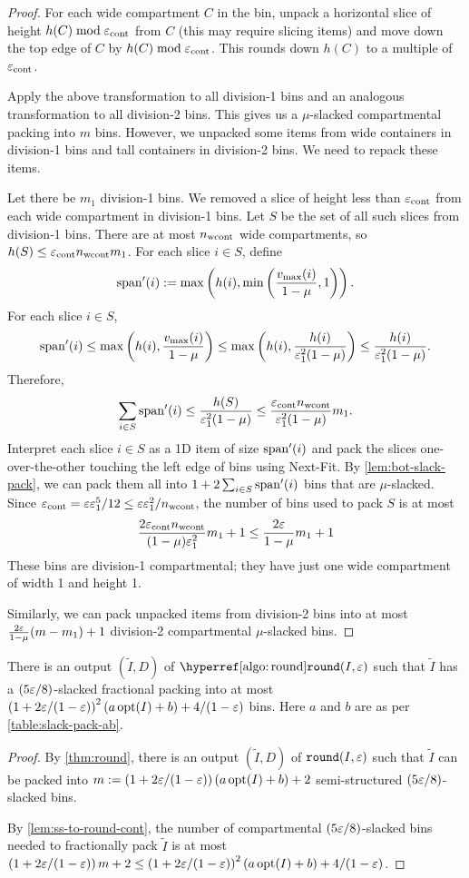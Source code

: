 \begin{proof}
For each wide compartment $C$ in the bin, unpack a horizontal slice of height
$h(C) \bmod \varepsilon_{\mathrm{cont}}$ from $C$ (this may require slicing items)
and move down the top edge of $C$ by $h(C) \bmod \varepsilon_{\mathrm{cont}}$.
This rounds down $h(C)$ to a multiple of $\varepsilon_{\mathrm{cont}}$.

Apply the above transformation to all division-1 bins
and an analogous transformation to all division-2 bins.
This gives us a $\mu$-slacked compartmental packing into $m$ bins.
However, we unpacked some items from wide containers in division-1 bins
and tall containers in division-2 bins. We need to repack these items.

Let there be $m_1$ division-1 bins. We removed a slice of height less than $\varepsilon_{\mathrm{cont}}$
from each wide compartment in division-1 bins.
Let $S$ be the set of all such slices from division-1 bins.
There are at most $n_{\mathrm{wcont}}$ wide compartments, so $h(S) \le \varepsilon_{\mathrm{cont}}n_{\mathrm{wcont}} m_1$.
For each slice $i \in S$, define
\[ \operatorname{span}'(i) := \max\left(h(i), \min\left(\frac{v_{\max}(i)}{1-\mu}, 1\right)\right). \]
For each slice $i \in S$,
\[ \operatorname{span}'(i) \le \max\left(h(i), \frac{v_{\max}(i)}{1-\mu}\right)
\le \max\left(h(i), \frac{h(i)}{\varepsilon_1^2(1-\mu)}\right)
\le \frac{h(i)}{\varepsilon_1^2(1-\mu)}. \]
Therefore,
\[ \sum_{i \in S} \operatorname{span}'(i) \le \frac{h(S)}{\varepsilon_1^2(1-\mu)}
\le \frac{\varepsilon_{\mathrm{cont}}n_{\mathrm{wcont}}}{\varepsilon_1^2(1-\mu)} m_1. \]
Interpret each slice $i \in S$ as a 1D item of size $\operatorname{span}'(i)$ and pack the slices
one-over-the-other touching the left edge of bins using Next-Fit.
By \cref{lem:bot-slack-pack}, we can pack them all into
$1 + 2\sum_{i \in S}\operatorname{span}'(i)$ bins that are $\mu$-slacked.
Since $\varepsilon_{\mathrm{cont}} = \varepsilon\varepsilon_1^5/12 \le \varepsilon\varepsilon_1^2/n_{\mathrm{wcont}}$,
the number of bins used to pack $S$ is at most
\[ \frac{2\varepsilon_{\mathrm{cont}}n_{\mathrm{wcont}}}{(1-\mu)\varepsilon_1^2} m_1 + 1
\le \frac{2\varepsilon}{1-\mu} m_1 + 1 \]
These bins are division-1 compartmental;
they have just one wide compartment of width 1 and height 1.

Similarly, we can pack unpacked items from division-2 bins
into at most $\frac{2\varepsilon}{1-\mu} (m-m_1) + 1$ division-2 compartmental $\mu$-slacked bins.
\end{proof}

\begin{theorem}
\label{thm:struct-theorem}
There is an output $(\widetilde{I}, D)$ of $\roundHyp(I, \eps)$ such that $\widetilde{I}$
has a \compartmentalHyp{} $(5\varepsilon/8)$-slacked fractional packing into at most
$\left( 1 + 2\varepsilon/(1-\varepsilon) \right)^2 (a\operatorname{opt}(I) + b) + 4/(1-\varepsilon)$
bins. Here $a$ and $b$ are as per \cref{table:slack-pack-ab}.
\end{theorem}
\begin{proof}
By \cref{thm:round}, there is an output $(\widetilde{I}, D)$ of $\operatorname{\mathtt{round}}(I, \varepsilon)$
such that $\widetilde{I}$ can be packed into
$m := \left( 1 + 2\varepsilon/(1-\varepsilon) \right)(a\operatorname{opt}(I) + b) + 2$
semi-structured $(5\varepsilon/8)$-slacked bins.

By \cref{lem:ss-to-round-cont}, the number of compartmental $(5\varepsilon/8)$-slacked
bins needed to fractionally pack $\widetilde{I}$ is at most
$\left( 1 + 2\varepsilon/(1-\varepsilon) \right) m + 2
\le \left( 1 + 2\varepsilon/(1-\varepsilon) \right)^2 (a\operatorname{opt}(I) + b) + 4/(1-\varepsilon)$.
\end{proof}

